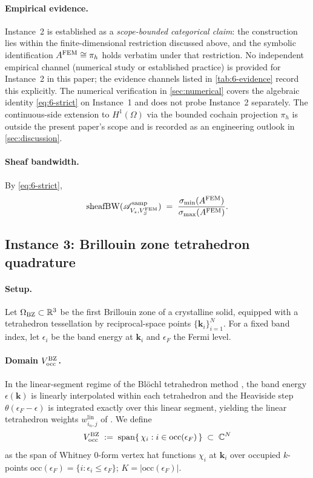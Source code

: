 \paragraph{Empirical evidence.}
Instance~2 is established as a \emph{scope-bounded categorical claim}:
the construction lies within the finite-dimensional restriction
discussed above, and the symbolic identification $A^{\mathrm{FEM}} \cong \pi_h$
holds verbatim under that restriction. No independent empirical channel
(numerical study or established practice) is provided for Instance~2 in
this paper; the evidence channels listed in \cref{tab:6-evidence} record
this explicitly. The numerical verification in \cref{sec:numerical}
covers the algebraic identity \cref{eq:6-strict} on Instance~1 and does
not probe Instance~2 separately. The continuous-side extension to
$H^1(\Omega)$ via the bounded cochain projection $\pi_h$ is outside the
present paper's scope and is recorded as an engineering outlook in
\cref{sec:discussion}.

\paragraph{Sheaf bandwidth.}
By \cref{eq:6-strict},
\[
  \operatorname{sheafBW}(\mathscr{A}^{\mathrm{samp}}_{V_s, V_S^{\mathrm{FEM}}})
  \;=\;
  \frac{\sigma_{\min}(A^{\mathrm{FEM}})}{\sigma_{\max}(A^{\mathrm{FEM}})}.
\]

\subsection{Instance 3: Brillouin zone tetrahedron quadrature}\label{subsec:6-bz}

\paragraph{Setup.}
Let $\Omega_{\mathrm{BZ}} \subset \mathbb{R}^3$ be the first Brillouin zone of a
crystalline solid, equipped with a tetrahedron tessellation by
reciprocal-space points $\{\mathbf{k}_i\}_{i=1}^{N}$. For a fixed band
index, let $\epsilon_i$ be the band energy at $\mathbf{k}_i$ and
$\epsilon_F$ the Fermi level.

\paragraph{Domain $V_{\mathrm{occ}}^{\mathrm{BZ}}$.}
In the linear-segment regime of the Bl\"ochl tetrahedron method
\cite[\S II.B]{Blochl1994}, the band energy $\epsilon(\mathbf{k})$ is
linearly interpolated within each tetrahedron and the Heaviside step
$\theta(\epsilon_F - \epsilon)$ is integrated exactly over this linear
segment, yielding the linear tetrahedron weights $w^{\mathrm{lin}}_{i_n, j}$
of \cite{LehmannTaut1972,JepsenAndersen1971,Blochl1994}. We define
\[
  V_{\mathrm{occ}}^{\mathrm{BZ}}
  \;:=\;
  \operatorname{span}\{\, \chi_i : i \in \mathrm{occ}(\epsilon_F) \,\}
  \;\subset\;
  \mathbb{C}^N
\]
as the span of Whitney $0$-form vertex hat functions $\chi_i$ at
$\mathbf{k}_i$ over occupied $k$-points
$\mathrm{occ}(\epsilon_F) = \{i : \epsilon_i \le \epsilon_F\}$;
$K = |\mathrm{occ}(\epsilon_F)|$.

